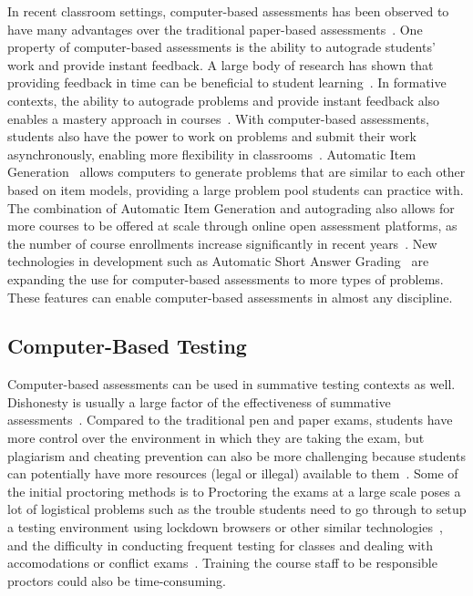 \documentclass[review,sigconf]{acmart}
\begin{document}
In recent classroom settings, computer-based assessments has been observed to have many advantages over the traditional paper-based assessments~\cite{chen2019generation}. 
One property of computer-based assessments is the ability to autograde students' work and provide instant feedback. A large body of research has shown that providing feedback in time can be beneficial to student learning~\cite{anderson1995cognitive}. 
In formative contexts, the ability to autograde problems and provide instant feedback also enables a mastery approach in courses~\cite{west2015prairielearn}. 
With computer-based assessments, students also have the power to work on problems and submit their work asynchronously, enabling more flexibility in classrooms~\cite{zhao2023flexibility}. 
Automatic Item Generation~\cite{chen2019generation} allows computers to generate problems that are similar to each other based on item models, providing a large problem pool students can practice with. 
The combination of Automatic Item Generation and autograding also allows for more courses to be offered at scale through online open assessment platforms, as the number of course enrollments increase significantly in recent years~\cite{silva2020measuring}. 
New technologies in development such as Automatic Short Answer Grading~\cite{bonthu2021automated} are expanding the use for computer-based assessments to more types of problems. These features can enable computer-based assessments in almost any discipline. 

\subsection{Computer-Based Testing}

Computer-based assessments can be used in summative testing contexts as well. Dishonesty is usually a large factor of the effectiveness of summative assessments~\cite{arnold2016cheating}. 
Compared to the traditional pen and paper exams, students have more control over the environment in which they are taking the exam, but plagiarism and cheating prevention can also be more challenging because students can potentially have more resources (legal or illegal) available to them~\cite{kurniawan2020byod}. 
Some of the initial proctoring methods is to 
Proctoring the exams at a large scale poses a lot of logistical problems such as the trouble students need to go through to setup a testing environment using lockdown browsers or other similar technologies~\cite{kurniawan2020byod}, and the difficulty in conducting frequent testing for classes and dealing with accomodations or conflict exams~\cite{zilles2015cbtf}. 
Training the course staff to be responsible proctors could also be time-consuming. 
\end{document}
